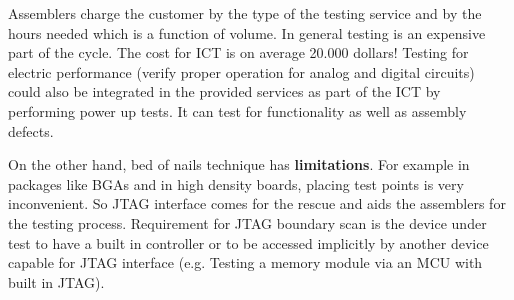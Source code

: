 \documentclass[final]{cubedoc}
\begin{document}
	Assemblers charge the customer by the type of the testing service and by the hours needed which is a function of volume. In general testing is an expensive part of the cycle.
	The cost for ICT is on average 20.000 dollars! 
	Testing for electric performance (verify proper operation for analog and digital circuits) could also be integrated in the provided services as part of the ICT by performing power up tests. It can test for functionality as well as assembly defects.
	
	On the other hand, bed of nails technique has \textbf{limitations}. For example in packages like BGAs and in high density boards, placing test points is very inconvenient. So JTAG interface comes for the rescue and aids the assemblers for the testing process. Requirement for JTAG boundary scan is the device under test to have a built in controller or to be accessed implicitly by another device capable for JTAG interface (e.g. Testing a memory module via an MCU with built in JTAG).
	
	
	
	
	
\end{document}
